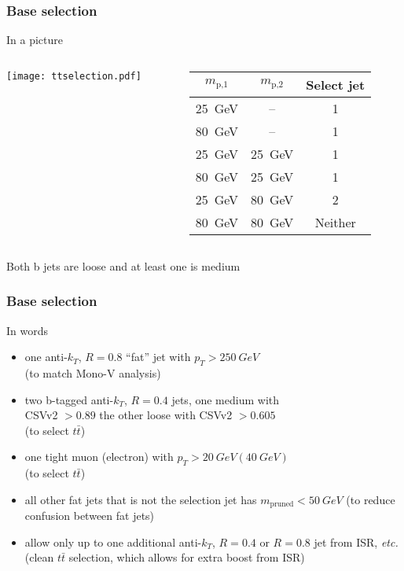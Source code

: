 \documentclass{beamer}
\begin{document}
\begin{frame}
  \frametitle{Base selection}
  In a picture \\
  \vspace{12pt}
  \begin{columns}
    \begin{column}{0.8\linewidth}
      \centering
      \texttt{[image: ttselection.pdf]}
    \end{column}
    \begin{column}{0.2\linewidth}
      \centering
      \vspace{-60pt}
      \hspace{-72pt}
      {\scriptsize
      \begin{tabular}{|c|c|c|}
        \hline
        $m_\text{p,1}$ & $m_\text{p,2}$ & Select jet \\
        \hline
        \SI{25}{GeV} & -- & 1 \\
        \SI{80}{GeV} & -- & 1 \\
        \SI{25}{GeV} & \SI{25}{GeV} & 1 \\
        \SI{80}{GeV} & \SI{25}{GeV} & 1 \\
        \SI{25}{GeV} & \SI{80}{GeV} & 2 \\
        \SI{80}{GeV} & \SI{80}{GeV} & Neither \\
        \hline
      \end{tabular}
      }
    \end{column}
  \end{columns}
  \vspace{12pt}
  Both b jets are loose and at least one is medium
\end{frame}

\begin{frame}
  \frametitle{Base selection}
  In words
  \begin{itemize}
  \item one anti-$k_T$, $R = 0.8$ ``fat'' jet with $p_T > \SI{250}{GeV}$ \\
    (to match Mono-V analysis)
  \item two b-tagged anti-$k_T$, $R = 0.4$ jets, one medium with
    \\ CSVv2 $> 0.89$ the other loose with CSVv2 $> 0.605$ \\
    (to select $t\bar{t}$)
  \item one tight muon (electron) with $p_T > \SI{20}{GeV} (\SI{40}{GeV})$ \\
    (to select $t\bar{t}$)
  \item all other fat jets that is not the selection jet has $m_\text{pruned} < \SI{50}{GeV}$
    (to reduce confusion between fat jets)
  \item allow only up to one additional anti-$k_T$, $R = 0.4$ or $R = 0.8$ jet from ISR,
    \emph{etc.} \\ (clean $t\bar{t}$ selection, which allows for extra boost from ISR)
  \end{itemize}
\end{frame}
\end{document}

